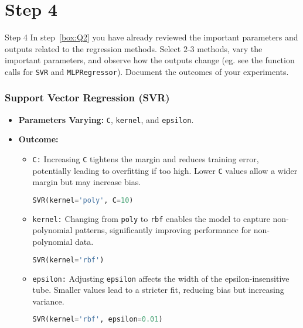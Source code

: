 \section*{Step 4}

\begin{custombox}[label={box:Q4}]{Step 4}
	In step~\ref{box:Q2} you have already reviewed the important parameters and outputs related to the regression methods. Select $2$-$3$ methods, vary the important parameters, and observe how the outputs change (eg. see the function calls for \verb|SVR| and \verb|MLPRegressor|). Document the outcomes of your experiments.
\end{custombox}


\subsubsection*{Support Vector Regression (SVR)}

\begin{itemize}
    \item \textbf{Parameters Varying:} \texttt{C}, \texttt{kernel}, and \texttt{epsilon}.
    \item \textbf{Outcome:}
    \begin{itemize}
        \item \texttt{C:} Increasing \texttt{C} tightens the margin and reduces training error, potentially leading to overfitting if too high. Lower \texttt{C} values allow a wider margin but may increase bias.
        \begin{lstlisting}[language=Python, caption=Increasing value of \texttt{C}]
SVR(kernel='poly', C=10)
        \end{lstlisting}
        \item \texttt{kernel:} Changing from \texttt{poly} to \texttt{rbf} enables the model to capture non-polynomial patterns, significantly improving performance for non-polynomial data.
        \begin{lstlisting}[language=Python, caption=Changing value of \texttt{kernel}]
SVR(kernel='rbf')
        \end{lstlisting}
        \item \texttt{epsilon:} Adjusting \texttt{epsilon} affects the width of the epsilon-insensitive tube. Smaller values lead to a stricter fit, reducing bias but increasing variance.
        \begin{lstlisting}[language=Python, caption=Adjusting value of \texttt{epsilon}]
SVR(kernel='rbf', epsilon=0.01)
        \end{lstlisting}
    \end{itemize}
\end{itemize}

